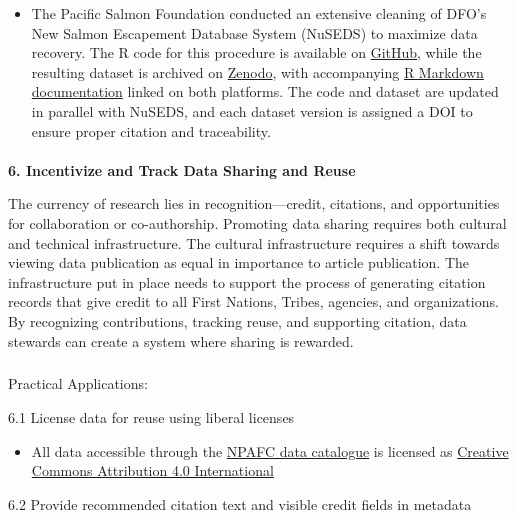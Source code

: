 \documentclass[
  letterpaper,
  DIV=11,
  numbers=noendperiod]{scrartcl}
\makeatletter
\let\oldparagraph\paragraph
\renewcommand{\paragraph}{
    \@ifstar
      \xxxParagraphStar
      \xxxParagraphNoStar
  }
\newcommand{\xxxParagraphStar}[1]{\oldparagraph*{#1}\mbox{}}
\newcommand{\xxxParagraphNoStar}[1]{\oldparagraph{#1}\mbox{}}
\let\oldsubparagraph\subparagraph
\renewcommand{\subparagraph}{
    \@ifstar
      \xxxSubParagraphStar
      \xxxSubParagraphNoStar
  }
\newcommand{\xxxSubParagraphStar}[1]{\oldsubparagraph*{#1}\mbox{}}
\newcommand{\xxxSubParagraphNoStar}[1]{\oldsubparagraph{#1}\mbox{}}
\providecommand{\tightlist}{%
  \setlength{\itemsep}{0pt}\setlength{\parskip}{0pt}}
\makeatother
\begin{document}
\begin{itemize}
\tightlist
\item
  The Pacific Salmon Foundation conducted an extensive cleaning of DFO's
  New Salmon Escapement Database System (NuSEDS) to maximize data
  recovery. The R code for this procedure is available on
  \href{https://github.com/salmonwatersheds/population-indicators/tree/master/spawner-surveys/code}{GitHub},
  while the resulting dataset is archived on
  \href{https://doi.org/10.5281/zenodo.14194638}{Zenodo}, with
  accompanying
  \href{https://bookdown.org/salmonwatersheds/1_nuseds_collation/}{R
  Markdown documentation} linked on both platforms. The code and dataset
  are updated in parallel with NuSEDS, and each dataset version is
  assigned a DOI to ensure proper citation and traceability.
\end{itemize}

\paragraph{\texorpdfstring{\textbf{6. Incentivize and Track Data Sharing
and
Reuse}}{6. Incentivize and Track Data Sharing and Reuse}}\label{incentivize-and-track-data-sharing-and-reuse}

The currency of research lies in recognition---credit, citations, and
opportunities for collaboration or co-authorship. Promoting data sharing
requires both cultural and technical infrastructure. The cultural
infrastructure requires a shift towards viewing data publication as
equal in importance to article publication. The infrastructure put in
place needs to support the process of generating citation records that
give credit to all First Nations, Tribes, agencies, and organizations.
By recognizing contributions, tracking reuse, and supporting citation,
data stewards can create a system where sharing is rewarded.

\subparagraph{Practical Applications:}\label{practical-applications-5}

6.1 License data for reuse using liberal licenses

\begin{itemize}
\tightlist
\item
  All data accessible through the \href{https://data.npafc.org}{NPAFC
  data catalogue} is licensed as
  \href{https://creativecommons.org/licenses/by/4.0/deed.en}{Creative
  Commons Attribution 4.0 International}
\end{itemize}

6.2 Provide recommended citation text and visible credit fields in
metadata
\end{document}
